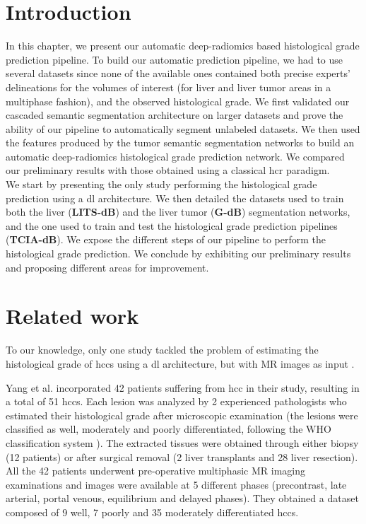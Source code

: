 \documentclass[]{article}
\newcommand{\lmttfont}[1]{{\fontfamily{lmtt}\selectfont #1}}
\begin{document}
\section{Introduction}


In this chapter, we present our automatic deep-radiomics based histological grade prediction pipeline. To build our automatic prediction pipeline, we had to use several datasets since none of the available ones contained both precise experts' delineations for the volumes of interest (for liver and liver tumor areas in a multiphase fashion), and the observed histological grade.
We first validated our cascaded semantic segmentation architecture on larger datasets and prove the ability of our pipeline to automatically segment unlabeled datasets. We then used the features produced by the tumor semantic segmentation networks to build an automatic deep-radiomics histological grade prediction network. We compared our preliminary results with those obtained using a classical \ac{hcr} paradigm. \\
We start by presenting the only study performing the histological grade prediction using a \ac{dl} architecture. We then detailed the datasets used to train both the liver (\textbf{\lmttfont{LITS-dB}}) and the liver tumor (\textbf{\lmttfont{G-dB}}) segmentation networks, and the one used to train and test the histological grade prediction pipelines (\textbf{\lmttfont{TCIA-dB}}). We expose the different steps of our pipeline to perform the histological grade prediction. We conclude by exhibiting our preliminary results and proposing different areas for improvement.

\section{Related work}

To our knowledge, only one study tackled the problem of estimating the
histological grade of \ac{hcc}s using a \ac{dl} architecture, but with MR images
as input \cite{Yang2019}.

Yang et al. incorporated 42 patients suffering from \ac{hcc} in their study,
resulting in a total of 51 \ac{hcc}s. Each lesion was analyzed by 2
experienced pathologists who estimated their histological grade after
microscopic examination (the lesions were classified as well, moderately
and poorly differentiated, following the WHO classification system \cite{20113051318}).
The extracted tissues were obtained through either biopsy (12 patients)
or after surgical removal (2 liver transplants and 28 liver resection).
All the 42 patients underwent pre-operative multiphasic MR imaging
examinations and images were available at 5 different phases
(precontrast, late arterial, portal venous, equilibrium and delayed
phases). They obtained a dataset composed of 9 well, 7 poorly and 35 moderately
differentiated \ac{hcc}s.
\end{document}
